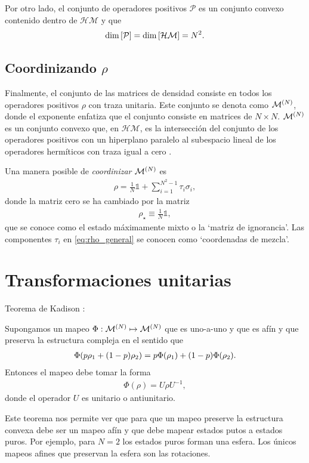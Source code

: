 Por otro lado, el conjunto de operadores positivos $\mathcal{P}$ es un 
conjunto convexo contenido dentro de $\mathcal{HM}$ y que
\begin{align}
	\dim \qty[\mathcal{P}] = \dim \qty[\mathcal{HM}]=N^2.
\end{align}
\subsection{Coordinizando  $\rho$} %

Finalmente, el conjunto de las matrices de densidad consiste en todos los operadores
positivos $\rho$ con traza unitaria. Este conjunto se denota como 
$\mathcal{M}^{(N)}$, donde el exponente enfatiza que el conjunto consiste en 
matrices de $N\times N$. $\mathcal{M}^{(N)}$ es un conjunto convexo que, en $\mathcal{HM}$, 
es la intersección del conjunto de los operadores positivos con un 
hiperplano paralelo al subespacio lineal de los operadores hermíticos
con traza igual a cero \cite{bengtsson_zyczkowski_2017}.

Una manera posible de \textit{coordinizar} $\mathcal{M}^{(N)}$ es 
\begin{align}
	\rho = \frac{1}{N} \mathbb{1} + \sum _{i=1}^{N^2-1} \tau_i\sigma_i,	
	\label{eq:rho_general}
\end{align}
donde la matriz cero se ha cambiado por la matriz
\begin{align}
	\rho _{\star} \equiv \frac{1}{N}\mathbb{1},
	\label{eq:max_mixed_state}
\end{align}
que se conoce como el estado máximamente mixto o la `matriz de ignorancia'. 
Las componentes $\tau_i$ en \eqref{eq:rho_general} se conocen como `coordenadas
de mezcla'.
\section{Transformaciones unitarias} %

Teorema de Kadison \cite{bengtsson_zyczkowski_2017}:
\begin{teorema} 
	Supongamos un mapeo $\Phi:\mathcal{M}^{(N)} \mapsto \mathcal{M}^{(N)}$ que es uno-a-uno y que es afín y
	que preserva la estructura compleja en el sentido que
	\begin{align}
		\Phi \qty(p\rho_1 + \qty(1-p)\rho_2) = p\Phi(\rho_1) + 
		\qty(1-p)\Phi(\rho_2).
	\end{align}
	Entonces el mapeo debe tomar la forma
	\begin{align}
		\Phi(\rho) = U\rho U^{-1},
	\end{align}
	donde el operador $U$ es unitario o antiunitario.
\end{teorema}

Este teorema nos permite ver que para que un mapeo preserve la estructura 
convexa debe ser un mapeo afín y que debe mapear estados putos
a estados puros. Por ejemplo, para $N=2$ los estados puros forman una
esfera. Los únicos mapeos afines que preservan la esfera son las rotaciones.


